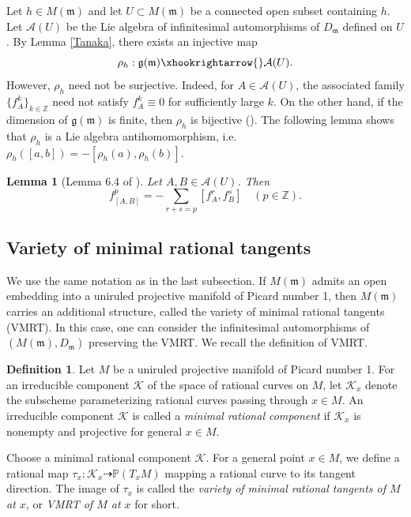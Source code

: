 \documentclass{amsart}
\newtheorem{lemma}[theorem]{Lemma}
\theoremstyle{definition}
\newtheorem{definition}{Definition}
\theoremstyle{remark}
\newcommand{\Z}{\mathbb{Z}}
\newcommand{\g}{\mathfrak{g}}
\newcommand{\m}{\mathfrak{m}}
\begin{document}
Let $h \in M(\m)$ and let $U \subset M(\m)$ be a connected open subset containing $h$. Let $\mathcal{A}(U)$ be the Lie algebra of infinitesimal automorphisms of $D_\m$ defined on $U$. By Lemma \ref{Tanaka}, there exists an injective map 
\[\rho_h: \g(\m)  \xhookrightarrow{} \mathcal{A}(U).\]
However, $\rho_h$ need not be surjective. Indeed, for $A \in \mathcal{A}(U)$, the associated family $\{f^k_A\}_{k \in \Z}$ need not satisfy $f^k_A \equiv 0$ for sufficiently large $k$. On the other hand, if the dimension of $\g(\m)$ is finite, then $\rho_h$ is bijective (\cite{Y}). The following lemma shows that $\rho_h$ is a Lie algebra antihomomorphism, i.e. $\rho_h([a, b]) = -[\rho_h(a), \rho_h(b)]$.

\begin{lemma}[Lemma 6.4 of \cite{T}]
\label{Lie bracket}
Let $A, B \in \mathcal{A}(U)$. Then 
\[f_{[A, B]}^p = - \sum_{r+s = p} [f_A^r, f_B^s] \quad (p \in \Z).\]
\end{lemma}


\subsection{Variety of minimal rational tangents}

We use the same notation as in the last subsection. If $M(\m)$ admits an open embedding into a uniruled projective manifold of Picard number 1, then $M(\m)$ carries an additional structure, called the variety of minimal rational tangents (VMRT). In this case, one can consider the infinitesimal automorphisms of $(M(\m), D_\m)$ preserving the VMRT. We recall the definition of VMRT.


\begin{definition}
\label{VMRT}
Let $M$ be a uniruled projective manifold of Picard number 1. For an irreducible component $\mathcal{K}$ of the space of rational curves on $M$, let $\mathcal{K}_x$ denote the subscheme parameterizing rational curves passing through $x \in M$. An irreducible component $\mathcal{K}$ is called a {\it minimal rational component} if $\mathcal{K}_x$ is nonempty and projective for general $x \in M$.

Choose a minimal rational component $\mathscr{K}$. For a general point $x \in M$, we define a rational map $\tau_x: \mathscr{K}_x \dashrightarrow \mathbb{P}(T_xM)$ mapping a rational curve to its tangent direction. The image of $\tau_x$ is called the {\it variety of minimal rational tangents of $M$ at $x$}, or {\it VMRT of $M$ at $x$} for short.
\end{definition}
\end{document}

